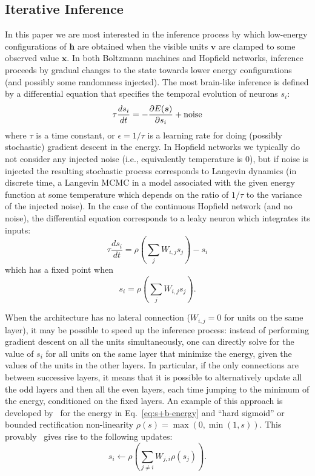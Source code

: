 \documentclass{article}
\newcommand   \vv{{\bm v}}
\newcommand   \vx{{\bm x}}
\newcommand   \vh{{\bm h}}
\newcommand   \vs{{\bm s}}
\begin{document}
\subsection{Iterative Inference}

In this paper we are most interested in the inference process by which low-energy
configurations of $\vh$ are obtained when the visible units $\vv$ are clamped
to some observed value $\vx$. In both Boltzmann machines and Hopfield networks,
inference proceeds by gradual changes to the state towards lower energy
configurations (and possibly some randomness injected). The most brain-like
inference is defined by a differential equation that specifies the temporal
evolution of neurons $s_i$:
\begin{equation}
  \label{eq:dsdt}
  \tau \frac{ds_i}{dt} = - \frac{\partial E(\vs)}{\partial s_i} + {\rm noise}
\end{equation}
where $\tau$ is a time constant, or $\epsilon=1/\tau$ is a learning rate for doing
(possibly stochastic) gradient descent in the energy. In Hopfield networks we
typically do not consider any injected noise (i.e., equivalently temperature is 0), but if noise is injected the resulting
stochastic process corresponds to Langevin dynamics (in discrete time, a Langevin
MCMC in a model associated with the given energy function at some temperature which
depends on the ratio of $1/\tau$ to the variance of the injected noise).
In the case of the continuous Hopfield network (and no noise), the differential equation corresponds
to a leaky neuron which integrates its inputs:
\begin{equation}
  \tau \frac{ds_i}{dt} = \rho(\sum_j W_{i,j} s_j) - s_i
\end{equation}
which has a fixed point when
\begin{equation}
   s_i = \rho(\sum_j W_{i,j} s_j).
\end{equation}

When the architecture has no lateral connection ($W_{i,j}=0$ for units on the same layer),
it may be possible to speed up the inference process: instead of performing
gradient descent on all the units simultaneously, one can directly solve
for the value of $s_i$ for all units on the same layer that minimize the
energy, given the values of the units in the other layers. In particular,
if the only connections are between successive layers, it means that it is
possible to alternatively update all the odd layers and then all the even
layers, each time jumping to the minimum of the energy, conditioned on
the fixed layers. An example of this approach is developed by~\citet{Scellier+Bengio-arxiv2016}
for the energy in Eq.~\ref{eq:s+b-energy} and ``hard sigmoid''
or bounded rectification non-linearity $\rho(s)=\max(0,\min(1,s))$.
This provably~\citep{Scellier+Bengio-arxiv2016} gives rise to the following updates:
\begin{equation}
  \label{eq:direct}
   s_i \leftarrow \rho(\sum_{j\neq i} W_{j,i} \rho(s_j)). %
\end{equation}
\end{document}

